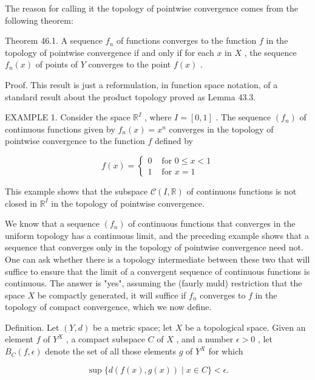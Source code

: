 \documentclass[10pt]{article}
\begin{document}
The reason for calling it the topology of pointwise convergence comes from the following theorem:

Theorem 46.1. A sequence \({f}_{n}\) of functions converges to the function \(f\) in the topology of pointwise convergence if and only if for each \(x\) in \(X\) , the sequence \({f}_{n}\left( x\right)\) of points of \(Y\) converges to the point \(f\left( x\right)\) .

Proof. This result is just a reformulation, in function space notation, of a standard result about the product topology proved as Lemma 43.3.

EXAMPLE 1. Consider the space \({\mathbb{R}}^{I}\) , where \(I = \left\lbrack  {0,1}\right\rbrack\) . The sequence \(\left( {f}_{n}\right)\) of continuous functions given by \({f}_{n}\left( x\right)  = {x}^{n}\) converges in the topology of pointwise convergence to the function \(f\) defined by

\[
f\left( x\right)  = \left\{  \begin{array}{ll} 0 & \text{ for }0 \leq  x < 1 \\  1 & \text{ for }x = 1 \end{array}\right.
\]

This example shows that the subspace \(\mathcal{C}\left( {I,\mathbb{R}}\right)\) of continuous functions is not closed in \({\mathbb{R}}^{I}\) in the topology of pointwise convergence.

We know that a sequence \(\left( {f}_{n}\right)\) of continuous functions that converges in the uniform topology has a continuous limit, and the preceding example shows that a sequence that converges only in the topology of pointwise convergence need not. One can ask whether there is a topology intermediate between these two that will suffice to ensure that the limit of a convergent sequence of continuous functions is continuous. The answer is "yes", assuming the (faurly muld) restriction that the space \(X\) be compactly generated, it will suffice if \({f}_{n}\) converges to \(f\) in the topology of compact convergence, which we now define.

Definition. Let \(\left( {Y,d}\right)\) be a metric space; let \(X\) be a topological space. Given an element \(f\) of \({Y}^{X}\) , a compact subspace \(C\) of \(X\) , and a number \(\epsilon  > 0\) , let \({B}_{C}\left( {f,\epsilon }\right)\) denote the set of all those elements \(g\) of \({Y}^{X}\) for which

\[
\sup \{ d\left( {f\left( x\right) ,g\left( x\right) }\right)  \mid  x \in  C\}  < \epsilon .
\]
\end{document}
